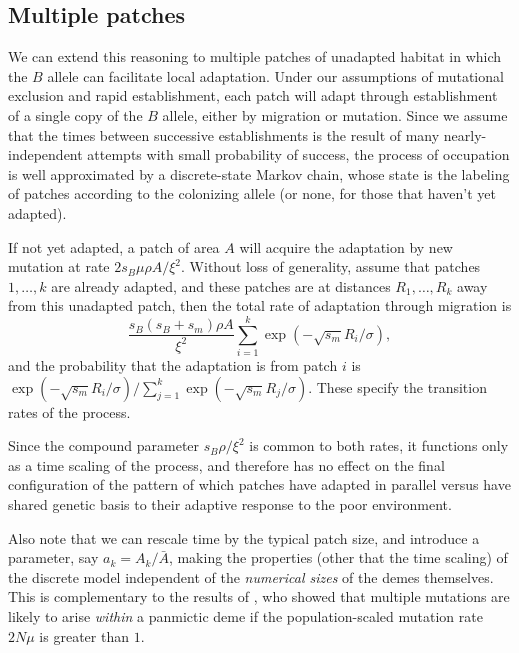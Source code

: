 \documentclass{article}
\begin{document}
\subsection{Multiple patches}


We can extend this reasoning to multiple patches of unadapted habitat 
in which the $B$ allele can facilitate local adaptation. 
Under our assumptions of mutational exclusion and rapid establishment, 
each patch will adapt through establishment of a single copy of the $B$ allele, 
either by migration or mutation.
Since we assume that the times between successive establishments is the result of many nearly-independent attempts
with small probability of success,
the process of occupation is well approximated by a discrete-state Markov chain,
whose state is the labeling of patches according to the colonizing allele
(or none, for those that haven't yet adapted).

If not yet adapted,
a patch of area $A$ will acquire the adaptation by new mutation at rate $2 s_B \mu \rho A/\xi^2$.
Without loss of generality, assume that patches $1, \ldots, k$ are already adapted,
and these patches are at distances $R_1, \ldots, R_k$ away from this unadapted patch, 
then the total rate of adaptation through migration is
\begin{equation}
  \frac{ s_B (s_B+s_m) \rho A}{\xi^2} \sum_{i=1}^{k} \exp\left(- \sqrt{s_m} R_i/\sigma\right),
\end{equation}
and the probability that the adaptation is from patch $i$ is $\exp\left(- \sqrt{s_m} R_i/\sigma\right)/\sum_{j=1}^{k} \exp\left(- \sqrt{s_m} R_j/\sigma\right)$.
These specify the transition rates of the process.

Since the compound parameter $s_B \rho / \xi^2$ is common to both rates,
it functions only as a time scaling of the process, 
and therefore has no effect on the final configuration of the pattern of which patches have adapted
in parallel versus have shared genetic basis to their adaptive response to the poor environment.

Also note that we can rescale time by the typical patch size, and introduce a parameter, say $a_k = A_k/\bar A$,
making the properties (other that the time scaling) of the discrete model independent of the \emph{numerical sizes} of the demes themselves.
This is complementary to the results of \cite{softsweepsII}, who showed that multiple mutations are likely to arise \emph{within} a panmictic deme
if the population-scaled mutation rate $2 N \mu$ is greater than $1$.
\end{document}
